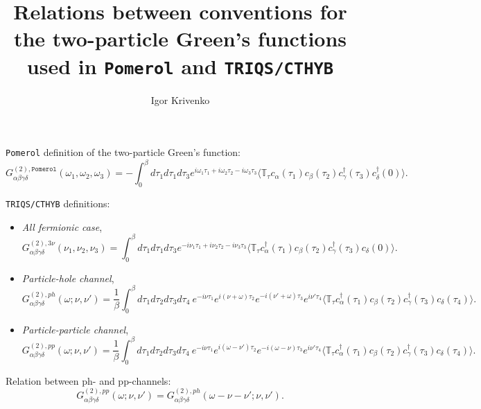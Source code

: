 \documentclass[a4paper,12pt]{article}
\newcommand{\aver}[1]{\ensuremath{\langle#1\rangle}}
\renewcommand{\t}{\ensuremath{\tau}}
\newcommand{\w}{\ensuremath{\omega}}
\newcommand{\n}{\ensuremath{\nu}}
\newcommand{\TT}{\ensuremath{\mathbb{T}_\t}}
\newcommand{\pom}{\ensuremath{\mathtt{Pomerol}}}
\begin{document}
\title{Relations between conventions for the two-particle Green's functions
       used in \texttt{Pomerol} and \texttt{TRIQS/CTHYB}}
\author{Igor Krivenko}
\maketitle

\texttt{Pomerol} definition of the two-particle Green's function:
\begin{equation}\label{g2_pomerol}
	G^{(2),\pom}_{\alpha\beta\gamma\delta}(\w_1,\w_2,\w_3) =
	- \int_0^\beta d\t_1d\t_1d\t_3
		e^{i\w_1\t_1 + i\w_2\t_2 - i\w_3\t_3}
		\aver{\TT
		c_\alpha(\t_1)c_\beta(\t_2)c^\dag_\gamma(\t_3)c^\dag_\delta(0)}.
\end{equation}

\texttt{TRIQS/CTHYB} definitions:
\begin{itemize}
	\item \textit{All fermionic case},
          \begin{equation}\label{g2_allfermionic}
	    G^{(2),3\nu}_{\alpha\beta\gamma\delta}(\nu_1,\nu_2,\nu_3) =
	    \int_0^\beta d\t_1d\t_1d\t_3
	    e^{-i\nu_1\t_1 + i\nu_2\t_2 - i\nu_3\t_3}
	    \aver{\TT
	      c^\dagger_\alpha(\t_1)c_\beta(\t_2)c^\dagger_\gamma(\t_3)c_\delta(0)}.
          \end{equation}
	\item \textit{Particle-hole channel},
		\begin{equation}\label{g2_ph}
			G^{(2),ph}_{\alpha\beta\gamma\delta}(\w;\n,\n') =
			\frac{1}{\beta}\int_0^\beta d\t_1d\t_2d\t_3d\t_4\
			e^{-i\n\t_1} e^{i(\n+\w)\tau_2} e^{-i(\n'+\w)\t_3} e^{i\n'\t_4}
			\aver{\TT
			c^\dag_\alpha(\t_1) c_\beta(\t_2) c^\dag_\gamma(\t_3)
			c_\delta(\t_4)}.
	\end{equation}

	\item \textit{Particle-particle channel},
		\begin{equation}\label{g2_pp}
			G^{(2),pp}_{\alpha\beta\gamma\delta}(\w;\n,\n') =
			\frac{1}{\beta}\int_0^\beta d\t_1d\t_2d\t_3d\t_4\
			e^{-i\n\t_1} e^{i(\w-\n')\t_2} e^{-i(\w-\n)\t_3} e^{i\n'\t_4}
			\aver{\TT
			c^\dag_\alpha(\t_1) c_\beta(\t_2) c^\dag_\gamma(\t_3)
			c_\delta(\t_4)}.
		\end{equation}
\end{itemize}

Relation between ph- and pp-channels:
\begin{equation}
	G^{(2),pp}_{\alpha\beta\gamma\delta}(\w;\n,\n') =
	G^{(2),ph}_{\alpha\beta\gamma\delta}(\w-\n-\n';\n,\n').
\end{equation}
\end{document}

